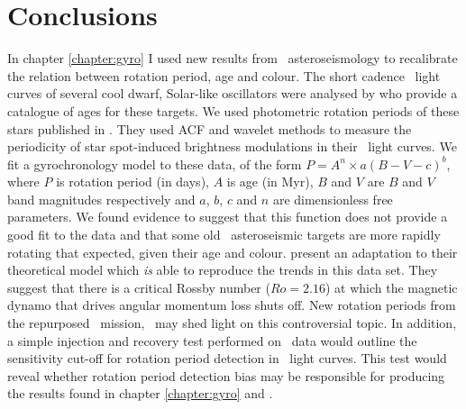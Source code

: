 \chapter{Conclusions}
\label{chapter:conclusions}

In chapter \ref{chapter:gyro} I used new results from \kepler\
asteroseismology to recalibrate the relation between rotation period, age and
colour.
The short cadence \kepler\ light curves of several cool dwarf, Solar-like
oscillators were analysed by \citet{Chaplin2014} who provide a catalogue of
ages for these targets.
We used photometric rotation periods of these stars published in
\citet{Garcia2014}.
They used ACF and wavelet methods to measure the periodicity of star
spot-induced brightness modulations in their \kepler\ light curves.
We fit a gyrochronology model to these data, of the form $P = A^n \times
a(B-V-c)^b$, where $P$ is rotation period (in days), $A$ is age (in Myr), $B$
and $V$ are $B$ and $V$ band magnitudes respectively and $a$, $b$, $c$ and $n$ are
dimensionless free parameters.
We found evidence to suggest that this function does not provide a good fit to
the data and that some old \kepler\ asteroseismic targets are more rapidly
rotating that expected, given their age and colour.
\citet{Vansaders2016} present an adaptation to their theoretical model which
{\it is} able to reproduce the trends in this data set.
They suggest that there is a critical Rossby number ($Ro=2.16$) at which the
magnetic dynamo that drives angular momentum loss shuts off.
New rotation periods from the repurposed \kepler\ mission, \ktwo\ may shed
light on this controversial topic.
In addition, a simple injection and recovery test performed on \kepler\ data
would outline the sensitivity cut-off for rotation period detection in
\kepler\ light curves.
This test would reveal whether rotation period detection bias may be
responsible for producing the results found in chapter \ref{chapter:gyro} and
\citet{Vansaders2016}.

